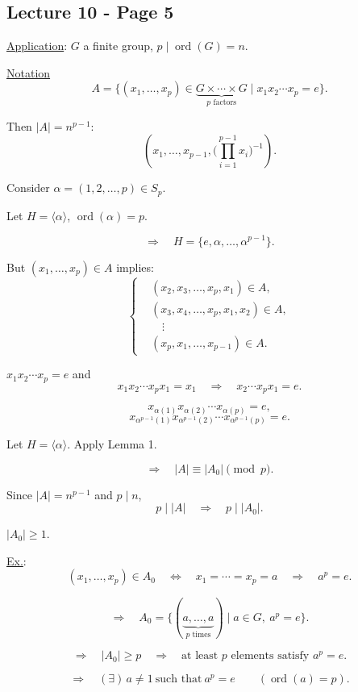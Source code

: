 
\subsection*{Lecture 10 - Page 5}

\noindent\underline{Application}: $G$ a finite group, $p\mid\operatorname{ord}(G)=n$.

\bigskip
\noindent\underline{Notation}
\[
A=\bigl\{(x_1,\ldots,x_p)\in
\underbrace{G\times\cdots\times G}_{p\text{ factors}}
\mid x_1x_2\cdots x_p=e\bigr\}.
\]

\noindent Then $|A|=n^{p-1}$:
\[
(x_1,\ldots,x_{p-1},
\bigl(\prod_{i=1}^{p-1}x_i\bigr)^{-1}).
\]

\medskip
\noindent Consider $\alpha=(1,2,\ldots,p)\in S_p$.

\medskip
\noindent Let $H=\langle\alpha\rangle$, $\operatorname{ord}(\alpha)=p$.

\[
\Longrightarrow\quad H=\{e,\alpha,\ldots,\alpha^{p-1}\}.
\]

\noindent But $(x_1,\ldots,x_p)\in A$ implies:
\[
\left\{\begin{aligned}
&(x_2,x_3,\ldots,x_p,x_1)\in A,\\
&(x_3,x_4,\ldots,x_p,x_1,x_2)\in A,\\
&\quad\vdots\\
&(x_p,x_1,\ldots,x_{p-1})\in A.
\end{aligned}\right.
\]

\noindent $x_1x_2\cdots x_p=e$ and
\[
x_1x_2\cdots x_px_1=x_1
\quad\Longrightarrow\quad x_2\cdots x_px_1=e.
\]

\[
x_{\alpha(1)}x_{\alpha(2)}\cdots x_{\alpha(p)}=e,
\]
\[
x_{\alpha^{p-1}(1)}x_{\alpha^{p-1}(2)}
\cdots x_{\alpha^{p-1}(p)}=e.
\]

\bigskip
\noindent Let $H=\langle\alpha\rangle$. Apply Lemma 1.

\[
\Longrightarrow\quad |A|\equiv |A_0|\pmod p.
\]

\noindent Since $|A|=n^{p-1}$ and $p\mid n$,
\[
p\mid |A|\quad\Longrightarrow\quad p\mid |A_0|.
\]

\noindent $|A_0|\geq 1$.

\medskip
\noindent\underline{Ex.}:
\[
(x_1,\ldots,x_p)\in A_0
\quad\Longleftrightarrow\quad
x_1=\cdots=x_p=a
\quad\Longrightarrow\quad a^p=e.
\]

\[
\Longrightarrow\quad
A_0=\bigl\{(\underbrace{a,\ldots,a}_{p\text{ times}})
\mid a\in G,\ a^p=e\bigr\}.
\]

\[
\Longrightarrow\quad |A_0|\geq p
\quad\Longrightarrow\quad
\text{at least }p\text{ elements satisfy }a^p=e.
\]

\[
\Longrightarrow\quad (\exists)\,a\neq 1
\ \text{such that}\ a^p=e
\qquad (\operatorname{ord}(a)=p).
\]
